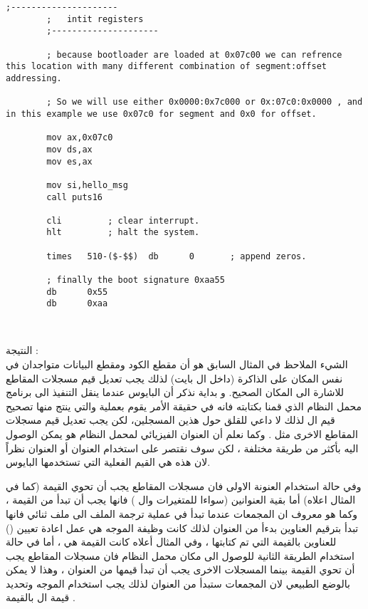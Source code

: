 \documentclass[document.tex]{subfiles}
\begin{document}
\begin{english}
\begin{lstlisting}[label=lst:welcom_bootloader,caption=\en{Welcom to OS World}]
		;---------------------
		;	intit registers
		;---------------------
		
		; because bootloader are loaded at 0x07c00 we can refrence this location with many different combination of segment:offset addressing.
		
		; So we will use either 0x0000:0x7c000 or 0x:07c0:0x0000 , and in this example we use 0x07c0 for segment and 0x0 for offset.
		
		mov ax,0x07c0			
		mov ds,ax
		mov es,ax
		
		mov si,hello_msg
		call puts16

		cli			; clear interrupt.		
		hlt			; halt the system.
		
		times	510-($-$$)	db		0		; append zeros.
		
		; finally the boot signature 0xaa55
		db		0x55
		db		0xaa
		
		
\end{lstlisting}
\end{english}


النتيجة :\\

الشيء الملاحظ في المثال السابق هو أن مقطع الكود  ومقطع البيانات  متواجدان في نفس المكان على الذاكرة (داخل ال  بايت) لذلك يجب تعديل قيم مسجلات المقاطع للاشارة الى المكان الصحيح.
و بداية نذكر أن البايوس عندما ينقل التنفيذ الى برنامج محمل النظام الذي قمنا بكتابته فانه في حقيقة الأمر يقوم بعملية  والتي ينتج منها تصحيح قيم ال  لذلك لا داعي للقلق حول هذين المسجلين، لكن يجب تعديل قيم مسجلات المقاطع الاخرى مثل . وكما نعلم أن العنوان الفيزيائي لمحمل النظام هو  يمكن الوصول اليه بأكثر من  طريقة مختلفة ، لكن سوف نقتصر على استخدام العنوان  أو العنوان  نظراً لان هذه هي القيم الفعلية التي تستخدمها البايوس.

وفي حالة استخدام العنونة الاولى فان مسجلات المقاطع يجب أن تحوي القيمة  (كما في المثال اعلاه) أما بقية العنوانين (سواءا للمتغيرات وال ) فانها يجب أن تبدأ من القيمة ، وكما هو معروف ان المجمعات عندما تبدأ في عملية ترجمة الملف الى ملف ثنائي فانها تبدأ بترقيم العناوين بدءأ من العنوان  لذلك كانت وظيفة الموجه  هي عمل اعادة تعيين () للعناوين بالقيمة التي تم كتابتها ، وفي المثال أعلاه كانت القيمة هي  ، أما في حالة استخدام الطريقة الثانية للوصول الى مكان محمل النظام فان مسجلات المقاطع يجب أن تحوي القيمة  بينما المسجلات الاخرى يجب أن تبدأ قيمها من العنوان  ، وهذا لا يمكن بالوضع الطبيعي لان المجمعات ستبدأ من العنوان  لذلك يجب استخدام الموجه  وتحديد قيمة ال  بالقيمة  .
\end{document}
